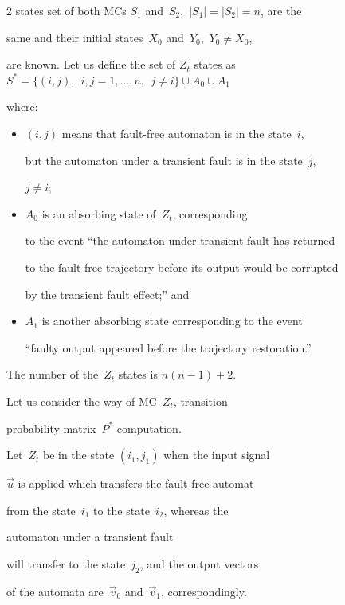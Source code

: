 \begin{multicols}{2}
states set of both MCs $S_1$ and~$S_2$,\  $|S_1|=|S_2|= n$, are the

same and their initial states~$X_0 $ and~$Y_0$,\  $Y_0 \ne X_0$,

are known. Let us define the set of $Z_t$ states as $S^* =

\{(i,j),\ \ i,j = 1,\ldots,n,\ \ j \ne i\} \cup A_0\cup A_1$

where:

\begin{itemize}

\item

$(i,j)$ means that fault-free automaton is in the state~$i$,

but the automaton under a transient fault is in the state~$j$,

$j\ne i$;

\item

$A_0$ is an absorbing state of~$Z_t$, corresponding

to the event ``the automaton under transient fault has returned

to the fault-free trajectory before its output would be corrupted

by the transient fault effect;'' and

\item

$A_1$ is another absorbing state corresponding to the event

``faulty output appeared  before the trajectory restoration.''

\end{itemize}



The number of the~$Z_t$ states is $n(n-1)+2$.



Let us consider the way of MC~$Z_t$, transition

probability matrix~$P^*$ computation.

Let~$Z_t$  be in the state $(i_1,j_1)$ when the input signal

$\vec u$ is applied which transfers the fault-free automat

from the state~$i_1$ to the state~$i_2$, whereas the

automaton under a transient fault

will transfer to the state~$j_2$, and the output vectors

of the automata are~$\vec v_0$ and~$\vec v_1$, correspondingly.


\end{multicols}
